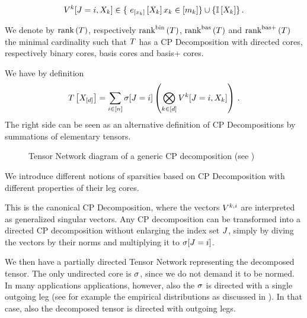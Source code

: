 \begin{definition}
\begin{itemize}
			\[ \legcoreofat{\atomenumerator}{\inddecvar,\catvariableof{\atomenumerator}}\in \{ \onehotmapofat{[\catindexof{\atomenumerator}]}{\catvariableof{\atomenumerator}} \catindexof{\atomenumerator}\in[\catdimof{\atomenumerator}] \} \cup \{\onesat{\catvariableof{\atomenumerator}}\}\, . \]
	\end{itemize}
	We denote by $\mathrm{rank}\left(T\right)$, respectively $\mathrm{rank}^{\mathrm{bin}}\left(T\right)$, $\mathrm{rank}^{\mathrm{bas}}\left(T\right)$ and $\mathrm{rank}^{\mathrm{bas+}}\left(T\right)$ the minimal cardinality such that $T$ has a CP Decomposition with directed cores, respectively binary cores, basis cores and basis+ cores.
\end{definition}

We have by definition
	\[ T\left[X_{[d]}\right] = \sum_{i\in[n]} \sigma[J=i] \left( \bigotimes_{k\in[d]} V^{k}[J=i,X_{k}] \right) \, . \]
The right side can be seen as an alternative definition of CP Decompositions by summations of elementary tensors.


\begin{figure}[h]
	\begin{center}
		
	\end{center}
	\caption{Tensor Network diagram of a generic CP decomposition (see )}
\end{figure}

We introduce different notions of sparsities based on CP Decomposition with different properties of their leg cores.


This is the canonical CP Decomposition, where the vectors $V^{k,i}$ are interpreted as generalized singular vectors.
Any CP decomposition can be transformed into a directed CP decomposition without enlarging the index set $J$, simply by diving the vectors by their norms and multiplying it to $\sigma[J=i]$.

We then have a partially directed Tensor Network representing the decomposed tensor.
The only undirected core is $\sigma$, since we do not demand it to be normed.
In many applications applications, however, also the $\sigma$ is directed with a single outgoing leg (see for example the empirical distributions as discussed in ).
In that case, also the decomposed tensor is directed with outgoing legs.



